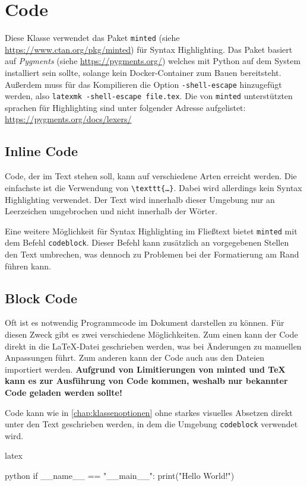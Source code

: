 \chapter{Code}
Diese Klasse verwendet das Paket \texttt{minted} (siehe \url{https://www.ctan.org/pkg/minted}) für Syntax Highlighting. Das Paket basiert auf \textit{Pygments} (siehe \url{https://pygments.org/}) welches mit Python auf dem System installiert sein sollte, solange kein Docker-Container zum Bauen bereitsteht. Außerdem muss für das Kompilieren die Option \texttt{-shell-escape} hinzugefügt werden, also \texttt{latexmk -shell-escape file.tex}. Die von \texttt{minted} unterstützten sprachen für Highlighting sind unter folgender Adresse aufgelistet: \url{https://pygments.org/docs/lexers/}

\section{Inline Code}
Code, der im Text stehen soll, kann auf verschiedene Arten erreicht werden. Die einfachste ist die Verwendung von \texttt{\textbackslash{}texttt\{…\}}. Dabei wird allerdings kein Syntax Highlighting verwendet. Der Text wird innerhalb dieser Umgebung nur an Leerzeichen umgebrochen und nicht innerhalb der Wörter.

Eine weitere Möglichkeit für Syntax Highlighting im Fließtext bietet \texttt{minted} mit dem Befehl \texttt{\texttt{codeblock}}. Dieser Befehl kann zusätzlich an vorgegebenen Stellen den Text umbrechen, was dennoch zu Problemen bei der Formatierung am Rand führen kann.

\section{Block Code}
Oft ist es notwendig Programmcode im Dokument darstellen zu können. Für diesen Zweck gibt es zwei verschiedene Möglichkeiten. Zum einen kann der Code direkt in die \LaTeX-Datei geschrieben werden, was bei Änderungen zu manuellen Anpassungen führt. Zum anderen kann der Code auch aus den Dateien importiert werden. \textbf{Aufgrund von Limitierungen von minted und TeX kann es zur Ausführung von Code kommen, weshalb nur bekannter Code geladen werden sollte!}

Code kann wie in \autoref{chap:klassenoptionen} ohne starkes visuelles Absetzen direkt unter den Text geschrieben werden, in dem die Umgebung \texttt{codeblock} verwendet wird.

\begin{showcode}{latex}
    \begin{code}{python}
        if __name__ == "__main__":
            print("Hello World!")
    \end{code}
\end{showcode}

